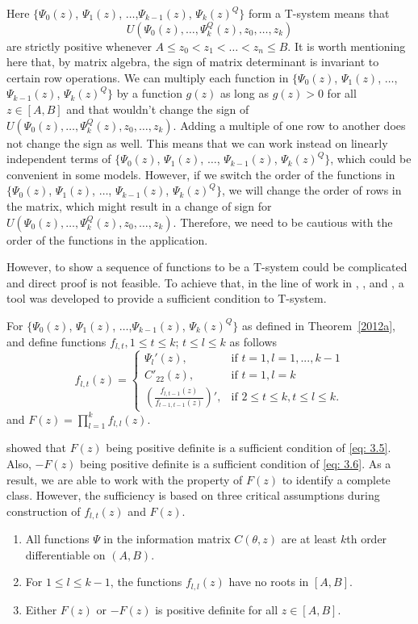 \documentclass[11pt]{amsart}
\theoremstyle{definition}
\theoremstyle{remark}
\numberwithin{equation}{section}
\begin{document}
Here $\{\Psi_0(z)$, $\Psi_1(z)$, $\ldots$,$\Psi_{k-1}(z)$, $\Psi_k(z)^Q\}$ form a T-system means that \[U(\Psi_0(z),\ldots,\Psi_k^Q(z), z_0,\ldots,z_k)\] are strictly positive whenever $A\le z_0 <z_1< \ldots< z_n\le B$. It is worth mentioning here that, by matrix algebra, the sign of matrix determinant is invariant to certain row operations. We can multiply each function in $\{\Psi_0(z)$, $\Psi_1(z)$, $\ldots$,$\Psi_{k-1}(z)$, $\Psi_k(z)^Q\}$ by a function $g(z)$ as long as $g(z)>0$ for all $z\in [A,B]$ and that wouldn't change the sign of $U(\Psi_0(z),\ldots,\Psi_k^Q(z), z_0,\ldots,z_k)$. Adding a multiple of one row to another does not change the sign as well. This means that we can work instead on linearly independent terms of $\{\Psi_0(z)$, $\Psi_1(z)$, $\ldots$, $\Psi_{k-1}(z)$, $\Psi_k(z)^Q\}$, which could be convenient in some models. However, if we switch the order of the functions in $\{\Psi_0(z)$, $\Psi_1(z)$, $\ldots$, $\Psi_{k-1}(z)$, $\Psi_k(z)^Q\}$, we will change the order of rows in the matrix, which might result in a change of sign for $U(\Psi_0(z),\ldots,\Psi_k^Q(z), z_0,\ldots,z_k)$. Therefore, we need to be cautious with the order of the functions in the application. 



 However, to show a sequence of functions to be a T-system could be complicated and direct proof is not feasible. To achieve that, in the line of work in \cite{yang2009}, \cite{yang2010}, and \cite{yang2012}, a tool was developed to provide a sufficient condition to T-system.

 For $\{\Psi_0(z)$, $\Psi_1(z)$, $\ldots$,$\Psi_{k-1}(z)$, $\Psi_k(z)^Q\}$ as defined in Theorem~\ref{2012a}, and define functions $f_{l,t}, 1\le t \le k$; $t\le l \le k$ as follows
\begin{equation}\label{eq: ff}
f_{l,t}(z) = \left \{ \begin{array}{ll}
\Psi_l'(z), & \text{if } t=1,l=1,...,k-1\\
C'_{22}(z), & \text{if } t=1,l=k\\
(\frac{f_{l,t-1}(z)}{f_{t-1,t-1}(z)})', & \text{if } 2\le t\le k, t\le l \le k.
\end{array}\right.
\end{equation}
and   $F(z) = \prod_{l=1}^k f_{l,l}(z)$. 

\cite{yang2012} showed that $F(z)$ being positive definite is a sufficient condition of \eqref{eq: 3.5}. Also, $-F(z)$ being positive definite is a sufficient condition of \eqref{eq: 3.6}. As a result, we are able to work with the property of $F(z)$ to identify a complete class. However, the sufficiency is based on three critical assumptions during construction of $f_{l,t}(z)$ and $F(z)$.
\begin{enumerate}
\item All functions $\Psi$ in the information matrix $C(\theta,z)$ are at least $k$th order differentiable on $(A,B)$.
\item For $1\le l\le k-1$, the functions $f_{l,l}(z)$ have no roots in $[A,B]$.
\item Either $F(z)$ or $-F(z)$ is positive definite for all $z\in [A,B]$.
\end{enumerate} 
\end{document}

